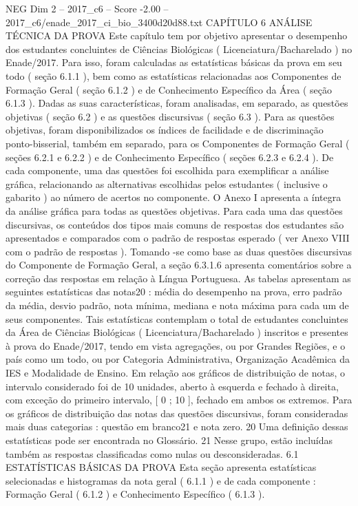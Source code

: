 \begin{textsample}{NEG Dim 2 – 2017\_c6 – Score -2.00 – 2017\_c6/enade\_2017\_ci\_bio\_3400d20d88.txt}  \label{ex:f2_neg_168}
CAPÍTULO 6 ANÁLISE TÉCNICA DA PROVA Este capítulo tem por objetivo apresentar o desempenho dos estudantes concluintes de Ciências Biológicas ( Licenciatura/Bacharelado ) no Enade/2017.
Para isso, foram calculadas as estatísticas básicas da prova em seu todo ( seção 6.1.1 ), bem como as estatísticas relacionadas aos Componentes de Formação Geral ( seção 6.1.2 ) e de Conhecimento Específico da Área ( seção 6.1.3 ).
Dadas as suas características, foram analisadas, em separado, as questões objetivas ( seção 6.2 ) e as questões discursivas ( seção 6.3 ).
Para as questões objetivas, foram disponibilizados os índices de facilidade e de discriminação ponto-bisserial, também em separado, para os Componentes de Formação Geral ( seções 6.2.1 e 6.2.2 ) e de Conhecimento Específico ( seções 6.2.3 e 6.2.4 ).
De cada componente, uma das questões foi escolhida para exemplificar a análise gráfica, relacionando as alternativas escolhidas pelos estudantes ( inclusive o gabarito ) ao número de acertos no componente.
O Anexo I apresenta a íntegra da análise gráfica para todas as questões objetivas.
Para cada uma das questões discursivas, os conteúdos dos tipos mais comuns de respostas dos estudantes são apresentados e comparados com o padrão de respostas esperado ( ver Anexo VIII com o padrão de respostas ).
Tomando -se como base as duas questões discursivas do Componente de Formação Geral, a seção 6.3.1.6 apresenta comentários sobre a correção das respostas em relação à Língua Portuguesa.
As tabelas apresentam as seguintes estatísticas das notas20 : média do desempenho na prova, erro padrão da média, desvio padrão, nota mínima, mediana e nota máxima para cada um de seus componentes.
Tais estatísticas contemplam o total de estudantes concluintes da Área de Ciências Biológicas ( Licenciatura/Bacharelado ) inscritos e presentes à prova do Enade/2017, tendo em vista agregações, ou por Grandes Regiões, e o país como um todo, ou por Categoria Administrativa, Organização Acadêmica da IES e Modalidade de Ensino.
Em relação aos gráficos de distribuição de notas, o intervalo considerado foi de 10 unidades, aberto à esquerda e fechado à direita, com exceção do primeiro intervalo, [ 0 ; 10 ], fechado em ambos os extremos.
Para os gráficos de distribuição das notas das questões discursivas, foram consideradas mais duas categorias : questão em branco21 e nota zero. 20 Uma definição dessas estatísticas pode ser encontrada no Glossário. 21 Nesse grupo, estão incluídas também as respostas classificadas como nulas ou desconsideradas. 6.1 ESTATÍSTICAS BÁSICAS DA PROVA Esta seção apresenta estatísticas selecionadas e histogramas da nota geral ( 6.1.1 ) e de cada componente : Formação Geral ( 6.1.2 ) e Conhecimento Específico ( 6.1.3 ).

\end{textsample}
